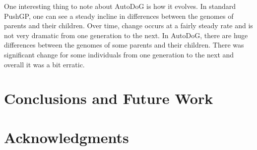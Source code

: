 \documentclass{sig-alternate}
\begin{document}
One interesting thing to note about AutoDoG is how it evolves. In standard PushGP, one can see a steady incline in differences between the genomes of parents and their children. Over time, change occurs at a fairly steady rate and is not very dramatic from one generation to the next. In AutoDoG, there are huge differences between the genomes of some parents and their children. There was significant change for some individuals from one generation to the next and overall it was a bit erratic.
\section{Conclusions and Future Work}
\label{sec:conclusion}

\section{Acknowledgments}
\label{sec:acknowledgments}



  

\end{document}
